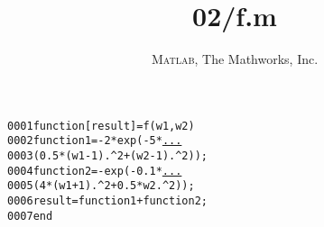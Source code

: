 \documentclass[a4paper,10pt]{article}
\title{02/f.m}
\author{\textsc{Matlab}, The Mathworks, Inc.}
\begin{document}
\maketitle
\begin{alltt}
0001 \textcolor{keyword}{function} [ result ] = f( w1, w2 )
0002     function1 = -2 * exp(-5 * \textcolor{keyword}{\underline{...}}
0003         (0.5 * (w1 - 1).\^{}2 + (w2 - 1).\^{}2));
0004     function2 = - exp(-0.1* \textcolor{keyword}{\underline{...}}
0005         (4 * (w1 + 1).\^{}2 + 0.5 * w2.\^{}2));
0006     result = function1 + function2;
0007 \textcolor{keyword}{end}
\end{alltt}
\end{document}
